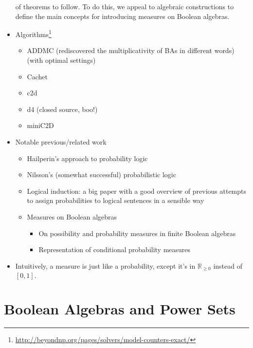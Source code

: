 \documentclass{article}
\theoremstyle{definition}
\theoremstyle{remark}
\begin{document}
\begin{itemize}
  of theorems to follow. To do this, we appeal to algebraic constructions to
  define the main concepts for introducing measures on Boolean algebras.
\item
  Algorithms\footnote{\url{http://beyondnp.org/pages/solvers/model-counters-exact/}}
  \begin{itemize}
  \item ADDMC \cite{DBLP:conf/aaai/DudekPV20} (rediscovered the
    multiplicativity of BAs in different words) (with optimal settings)
  \item Cachet \cite{DBLP:conf/sat/SangBBKP04}
  \item c2d \cite{DBLP:conf/ecai/Darwiche04}
  \item d4 \cite{DBLP:conf/ijcai/LagniezM17} (closed source, boo!)
  \item miniC2D  \cite{DBLP:conf/ijcai/OztokD15}
  \end{itemize}
\item Notable previous/related work
  \begin{itemize}
  \item Hailperin's approach to probability logic
    \cite{DBLP:journals/ndjfl/Hailperin84}
  \item Nilsson's (somewhat successful) probabilistic logic
    \cite{DBLP:journals/ai/Nilsson86,DBLP:journals/ai/Nilsson93}
  \item Logical induction: a big paper with a good overview of previous attempts
    to assign probabilities to logical sentences in a sensible way
    \cite{DBLP:journals/eccc/GarrabrantBCST16}
  \item Measures on Boolean algebras
    \begin{itemize}
    \item On possibility and probability measures in finite Boolean algebras
      \cite{DBLP:journals/soco/CastineiraCT02}
    \item Representation of conditional probability measures
      \cite{krauss1968representation}
    \end{itemize}
  \end{itemize}
\item Intuitively, a measure is just like a probability, except it's in
  $\mathbb{R}_{\ge 0}$ instead of $[0, 1]$.
\end{itemize}

\section{Boolean Algebras and Power Sets}
\end{document}

